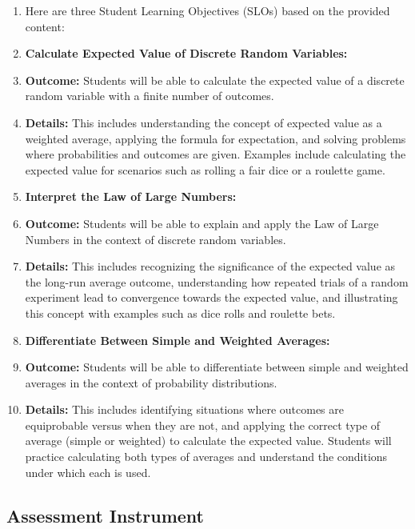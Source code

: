 \begin{enumerate}
    \item Here are three Student Learning Objectives (SLOs) based on the provided content:
    \item \textbf{Calculate Expected Value of Discrete Random Variables:}
    \item \textbf{Outcome:} Students will be able to calculate the expected value of a discrete random variable with a finite number of outcomes.
    \item \textbf{Details:} This includes understanding the concept of expected value as a weighted average, applying the formula for expectation, and solving problems where probabilities and outcomes are given. Examples include calculating the expected value for scenarios such as rolling a fair dice or a roulette game.
    \item \textbf{Interpret the Law of Large Numbers:}
    \item \textbf{Outcome:} Students will be able to explain and apply the Law of Large Numbers in the context of discrete random variables.
    \item \textbf{Details:} This includes recognizing the significance of the expected value as the long-run average outcome, understanding how repeated trials of a random experiment lead to convergence towards the expected value, and illustrating this concept with examples such as dice rolls and roulette bets.
    \item \textbf{Differentiate Between Simple and Weighted Averages:}
    \item \textbf{Outcome:} Students will be able to differentiate between simple and weighted averages in the context of probability distributions.
    \item \textbf{Details:} This includes identifying situations where outcomes are equiprobable versus when they are not, and applying the correct type of average (simple or weighted) to calculate the expected value. Students will practice calculating both types of averages and understand the conditions under which each is used.
\end{enumerate}


\subsection{Assessment Instrument}
\label{ssec:asse-3669}


